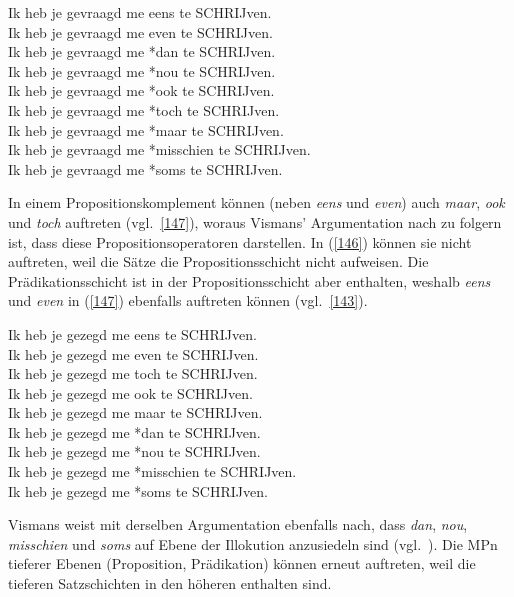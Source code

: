 \begin{exe}
	\ex\label{146} 
	Ik heb je gevraagd me eens te SCHRIJven.\\
	Ik heb je gevraagd me even te SCHRIJven.\\
	Ik heb je gevraagd me *dan te SCHRIJven.\\
	Ik heb je gevraagd me *nou te SCHRIJven.\\
	Ik heb je gevraagd me *ook te SCHRIJven.\\
	Ik heb je gevraagd me *toch te SCHRIJven.\\
	Ik heb je gevraagd me *maar te SCHRIJven.\\
	Ik heb je gevraagd me *misschien te SCHRIJven.\\
	Ik heb je gevraagd me *soms te SCHRIJven.
	\hfill\hbox{\citet[157]{Vismans1994}}
\end{exe}
In einem Propositionskomplement  können (neben \textit{eens} und \textit{even}) auch \textit{maar}, \textit{ook} und \textit{toch} auftreten (vgl.\ \ref{147}), woraus Vismans' Argumentation nach zu folgern ist, dass diese Propositionsoperatoren  darstellen. In (\ref{146}) können sie nicht auftreten, weil die Sätze die Propositionsschicht nicht aufweisen. Die Prädikationsschicht ist in der Propositionsschicht aber enthalten, weshalb \textit{eens} und \textit{even} in (\ref{147}) ebenfalls auftreten können (vgl.\ \ref{143}).

\begin{exe}
	\ex\label{147} 
	Ik   heb   je  gezegd me eens te SCHRIJven.\\
	Ik   heb   je  gezegd me even te SCHRIJven.\\
	Ik   heb   je  gezegd me toch te SCHRIJven.\\
	Ik   heb   je  gezegd me ook te SCHRIJven.\\
	Ik   heb   je  gezegd me maar te SCHRIJven.\\
	Ik   heb   je  gezegd me *dan te SCHRIJven.\\
	Ik   heb   je  gezegd me *nou te SCHRIJven.\\
	Ik   heb   je  gezegd me *misschien te SCHRIJven.\\
	Ik   heb   je  gezegd me *soms te SCHRIJven.
	\hfill\hbox{\citet[158]{Vismans1994}}
\end{exe}
Vismans weist mit derselben Argumentation ebenfalls nach, dass \textit{dan}, \textit{nou}, \textit{misschien} und \textit{soms} auf Ebene der Illokution anzusiedeln sind (vgl.\ \citealt[159]{Vismans1994}). Die MPn tieferer Ebenen (Proposition, Prädikation) können erneut auftreten, weil die tieferen Satzschichten in den höheren enthalten sind. 

